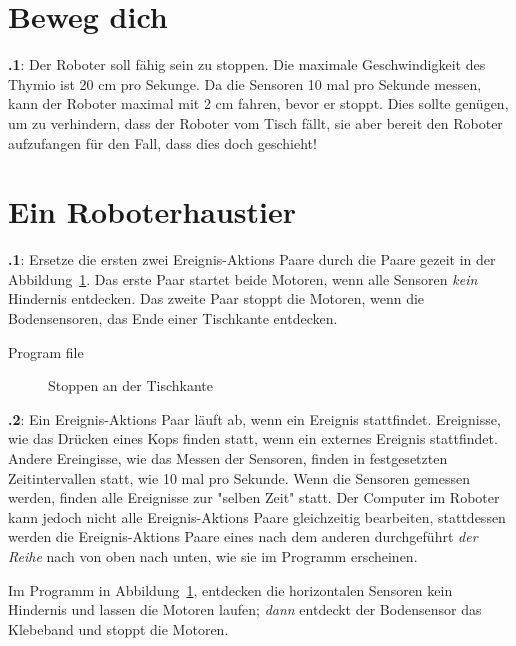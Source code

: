 \documentclass[12pt,a4paper,english]{article}
\begin{document}
\section{Beweg dich}

\textbf{\thesection.1}: Der Roboter soll fähig sein zu stoppen. Die maximale Geschwindigkeit des Thymio ist 20 cm pro Sekunge. Da die Sensoren 10 mal pro Sekunde messen, kann der Roboter maximal mit 2 cm fahren, bevor er stoppt. Dies sollte genügen, um zu verhindern, dass der Roboter vom Tisch fällt, sie aber bereit den Roboter aufzufangen für den Fall, dass dies doch geschieht!



\section{Ein Roboterhaustier}

\textbf{\thesection.1}: Ersetze die ersten zwei Ereignis-Aktions Paare durch die Paare gezeit in der Abbildung~\ref{fig.answer1}.
Das erste Paar startet beide Motoren, wenn alle Sensoren \emph{kein} Hindernis entdecken.
Das zweite Paar stoppt die Motoren, wenn die Bodensensoren, das Ende einer Tischkante entdecken.


{\raggedleft \hfill Program file }

\begin{figure}[hbt]
\begin{center}
\caption{Stoppen an der Tischkante}\label{fig.answer1}
\end{center}
\end{figure}

\textbf{\thesection.2}: 
Ein Ereignis-Aktions Paar läuft ab, wenn ein Ereignis stattfindet. Ereignisse, wie das Drücken eines Kops finden statt, wenn ein externes Ereignis stattfindet. Andere Ereingisse, wie das Messen der Sensoren, finden in festgesetzten Zeitintervallen statt, wie 10 mal pro Sekunde. Wenn die Sensoren gemessen werden, finden alle Ereignisse zur "selben Zeit" statt. Der Computer im Roboter kann jedoch nicht alle Ereignis-Aktions Paare gleichzeitig bearbeiten, stattdessen werden die Ereignis-Aktions Paare eines nach dem anderen durchgeführt \emph{der Reihe} nach von oben nach unten, wie sie im Programm erscheinen.

Im Programm in Abbildung~\ref{fig.answer1},
entdecken die horizontalen Sensoren kein Hindernis und lassen die Motoren laufen; \emph{dann} entdeckt der Bodensensor das Klebeband und stoppt die Motoren.
\end{document}
